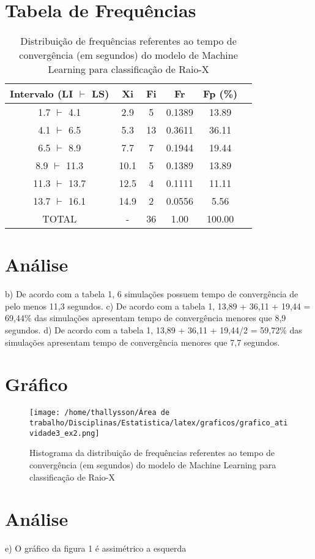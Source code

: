 \documentclass{article}
\begin{document}
	
	
	
	\section*{Tabela de Frequências}
	
	
	\begin{table}[H]
\centering
\caption{Distribuição de frequências referentes ao tempo de convergência (em segundos) do modelo de Machine Learning para classificação de Raio-X}
\begin{tabular}{cccccc}
\toprule
Intervalo (LI $\vdash$ LS) & Xi & Fi & Fr & Fp (\%) \\
\midrule
1.7 $\vdash$ 4.1   & 2.9  & 5  & 0.1389 & 13.89 \\
4.1 $\vdash$ 6.5   & 5.3  & 13 & 0.3611 & 36.11 \\
6.5 $\vdash$ 8.9   & 7.7  & 7  & 0.1944 & 19.44 \\
8.9 $\vdash$ 11.3  & 10.1 & 5  & 0.1389 & 13.89 \\
11.3 $\vdash$ 13.7 & 12.5 & 4  & 0.1111 & 11.11 \\
13.7 $\vdash$ 16.1 & 14.9 & 2  & 0.0556 & 5.56 \\
\midrule
TOTAL & - & 36 & 1.00 & 100.00 \\
\bottomrule
\end{tabular}
\label{tab:freq_intervalos_total}
\end{table}


\section*{Análise}
b) De acordo com a tabela 1, 6 simulações possuem tempo de convergência
de pelo menos 11,3 segundos.\newline\newline
c) De acordo com a tabela 1, 13,89 + 36,11 + 19,44 = 69,44\% das simulações apresentam tempo de convergência menores que 8,9 segundos. \newline\newline
d) De acordo com a tabela 1, 13,89 + 36,11 + 19,44/2 = 59,72\% 
das simulações apresentam tempo de convergência menores que 7,7 segundos.

	
	
	\section*{Gráfico}
	\begin{figure}[H]
		\centering
		\texttt{[image: /home/thallysson/Área de trabalho/Disciplinas/Estatistica/latex/graficos/grafico\_atividade3\_ex2.png]} %
		\caption{Histograma da distribuição de frequências referentes ao tempo de convergência (em segundos) do modelo de Machine Learning para classificação de Raio-X}
		\label{fig:grafico_filhos}
	\end{figure}
	
	\section*{Análise}
	e) O gráfico da figura 1 é assimétrico a esquerda
	

	
	
\end{document}
